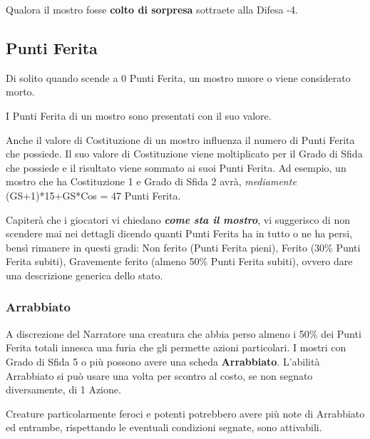 \begin{multicols}{2}
Qualora il mostro fosse \textbf{colto di sorpresa} sottraete alla Difesa -4.

\subsection{Punti Ferita}

Di solito quando scende a 0 Punti Ferita, un mostro muore o viene considerato morto.

I Punti Ferita di un mostro sono presentati con il suo valore.

Anche il valore di Costituzione di un mostro influenza il numero di Punti Ferita che possiede. Il suo valore di Costituzione viene moltiplicato per il Grado di Sfida che possiede e il risultato viene sommato ai suoi Punti Ferita. Ad esempio, un mostro che ha Costituzione 1 e Grado di Sfida 2 avrà, \emph{mediamente} (GS+1)*15+GS*Cos = 47 Punti Ferita.

Capiterà che i giocatori vi chiedano \textbf{\emph{come sta il mostro}}, vi suggerisco di non scendere mai nei dettagli dicendo quanti Punti Ferita ha in tutto o ne ha persi, bensì rimanere in questi gradi: Non ferito (Punti Ferita pieni), Ferito (30\% Punti Ferita subiti), Gravemente ferito (almeno 50\% Punti Ferita subiti), ovvero dare una descrizione generica dello stato. 

\subsubsection{Arrabbiato}\label{mostroarrabbiato}

A discrezione del Narratore una creatura che abbia perso almeno i 50\% dei Punti Ferita totali innesca una furia che gli permette azioni particolari.
I mostri con Grado di Sfida 5 o più possono avere una scheda \textbf{Arrabbiato}. L'abilità Arrabbiato si può usare una volta per scontro al costo, se non segnato diversamente, di 1 Azione.

Creature particolarmente feroci e potenti potrebbero avere più note di Arrabbiato ed entrambe, rispettando le eventuali condizioni segnate, sono attivabili.



\end{multicols}
